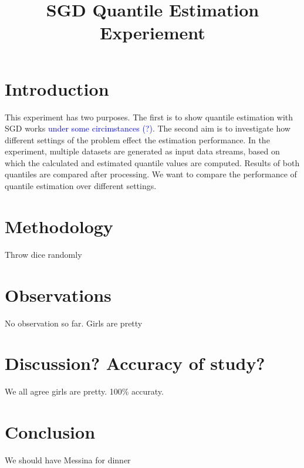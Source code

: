 \documentclass[12pt]{article}
\title{SGD Quantile Estimation Experiement}
\date{\vspace{-5ex}}
\begin{document}
\maketitle

\section{Introduction}

This experiment has two purposes. The first is to show quantile estimation with SGD works \textcolor{blue}{ under some circimstances (?)}.
The second aim is to investigate how different settings of the problem effect the estimation performance.
In the experiment, multiple datasets are generated as input data streams, based on which the calculated and estimated quantile values are computed. Results of both quantiles are compared after processing. We want to compare the performance of quantile estimation over different settings.


\section{Methodology}
Throw dice randomly
\section{Observations}
No observation so far. Girls are pretty \smiley{}
\section{Discussion? Accuracy of study?}
We all agree girls are pretty. 100\% accuraty.
\section{Conclusion}
We should have Messina for dinner
\end{document}

